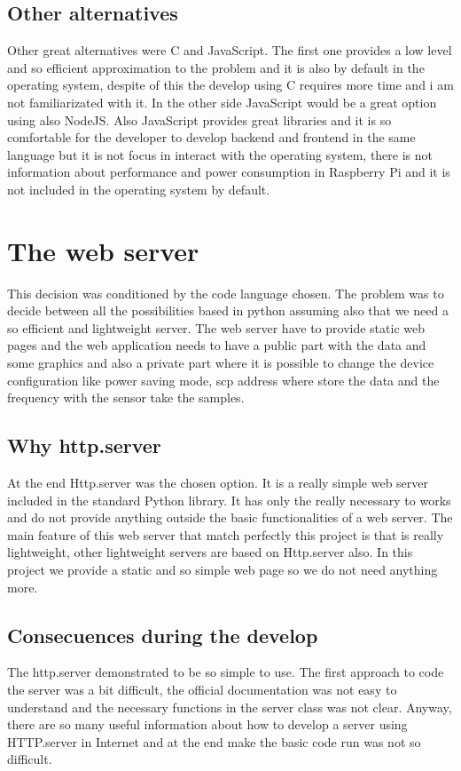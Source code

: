 		\subsection{Other alternatives}
		Other great alternatives were C and JavaScript. The first one provides a low level and so efficient approximation to the problem and it is also by default in the operating system, despite of this the develop using C requires more time and i am not familiarizated with it. In the other side JavaScript would be a great option using also NodeJS. Also JavaScript provides great libraries and it is so comfortable for the developer to develop backend and frontend in the same language but it is not focus in interact with the operating system, there is not information about performance and power consumption in Raspberry Pi and it is not included in the operating system by default.
	\section{The web server}
		This decision was conditioned by the code language chosen. The problem was to decide between all the possibilities based in python assuming also that we need a so efficient and lightweight server.
		The web server have to provide static web pages and the web application needs to have a public part with the data and some graphics and also a private part where it is possible to change the device configuration like power saving mode, scp address where store the data and the frequency with the sensor take the samples.
		\subsection{Why http.server}
		At the end Http.server was the chosen option. It is a really simple web server included in the standard Python library. It has only the really necessary to works and do not provide anything outside the basic functionalities of a web server. The main feature of this web server that match perfectly this project is that is really lightweight, other lightweight servers are based on Http.server also. In this project we provide a static and so simple web page so we do not need anything more.
		\subsection{Consecuences during the develop}%
		The http.server demonstrated to be so simple to use. The first approach to code the server was a bit difficult, the official documentation was not easy to understand and the necessary functions in the server class was not clear. Anyway, there are so many useful information about how to develop a server using HTTP.server in Internet and at the end make the basic code run was not so difficult.

